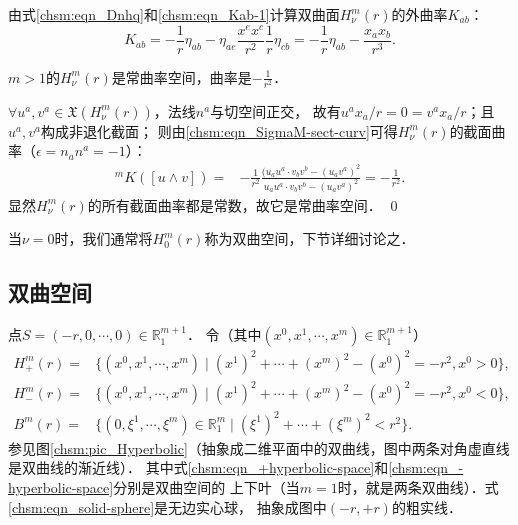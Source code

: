 由式\eqref{chsm:eqn_Dnhq}和\eqref{chsm:eqn_Kab-1}计算双曲面$H^m_{\nu}(r)$的外曲率$K_{ab}$：
\begin{equation}\label{chsm:eqn_phKab}
    K_{ab} %
    =-\frac{1}{r}\eta_{ab}-
    \eta_{ae} \frac{x^e x^c}{r^2}  \frac{1}{r}\eta_{cb}
    =-\frac{1}{r}\eta_{ab}- \frac{x_a x_b}{r^3} .
\end{equation}

\begin{example}\label{chsm:exm_HK}
    $m>1$的$H^m_\nu(r)$是常曲率空间，曲率是$-\frac{1}{r^2}$．
\end{example}
$\forall u^a,v^a\in \mathfrak{X}(H^m_\nu(r))$，法线$n^a$与切空间正交，
故有$ u^ax_a/r =0 = v^a x_a/r$；且$u^a,v^a$构成非退化截面；
则由\eqref{chsm:eqn_SigmaM-sect-curv}可得$H^m_\nu(r)$的截面曲率（$\epsilon=n_a n^a=-1$）：
\begin{align*}   
    {}^{m} K([u\wedge v]) 
    =&-\frac{1}{r^2}
    \frac{ ({u}_a{u}^a \cdot {v}_b{v}^b - ({u}_a{v}^a)^2 }
    {{u}_a{u}^a \cdot {v}_b{v}^b - ({u}_a{v}^a)^2 }
    =-\frac{1}{r^2} .
\end{align*}
显然$H^m_\nu(r)$的所有截面曲率都是常数，故它是常曲率空间．
\qed

当$\nu=0$时，我们通常将$H^m_0(r)$称为双曲空间，下节详细讨论之．



\subsection{双曲空间}\label{chsm:sec_hyperbolic}
点$S=(-r,0,\cdots,0)\in \mathbb{R}^{m+1}_1$．
令（其中$(x^0,x^1,\cdots,x^{m})\in \mathbb{R}^{m+1}_1$）
\setlength{\mathindent}{-1em}
\begin{align}
    H^m_{+}(r) = & \bigl\{(x^0,x^1,\cdots,x^{m})\mid (x^1)^2+\cdots+(x^m)^2 - (x^{0})^2 = -r^2,
    x^{0} >0\bigr\} , \label{chsm:eqn_+hyperbolic-space} \\
    H^m_{-}(r) = & \bigl\{(x^0,x^1,\cdots,x^{m})\mid (x^1)^2+\cdots+(x^m)^2 - (x^{0})^2 = -r^2,
    x^{0} <0\bigr\} , \label{chsm:eqn_-hyperbolic-space} \\
    B^m(r) = & \bigl\{(0,\xi^1,\cdots,\xi^{m})\in \mathbb{R}^{m}_1 \mid
    (\xi^1)^2+\cdots+(\xi^m)^2 < r^2\bigr\} . \label{chsm:eqn_solid-sphere}
\end{align} \setlength{\mathindent}{2em}
参见图\ref{chsm:pic_Hyperbolic}（抽象成二维平面中的双曲线，图中两条对角虚直线是双曲线的渐近线）．
其中式\eqref{chsm:eqn_+hyperbolic-space}和\eqref{chsm:eqn_-hyperbolic-space}分别是{\heiti 双曲空间}的
上下叶（当$m=1$时，就是两条双曲线）．式\eqref{chsm:eqn_solid-sphere}是无边实心球，
抽象成图中$(-r,+r)$的粗实线．

